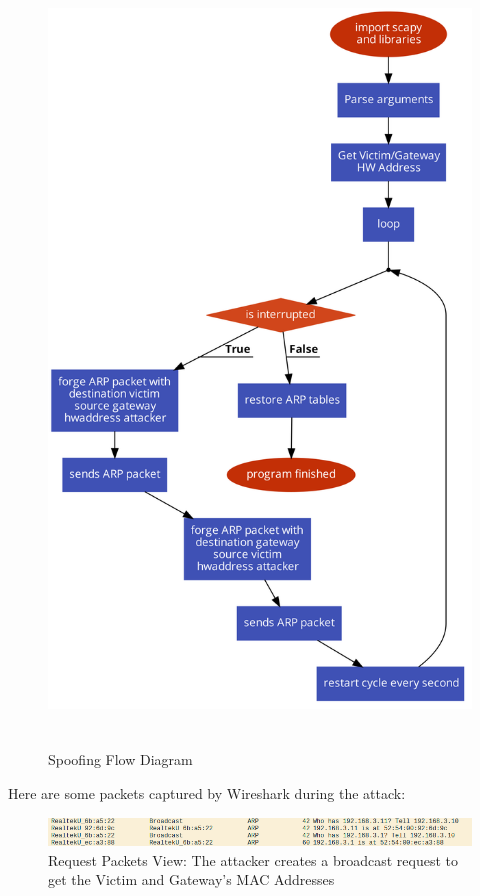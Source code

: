 \begin{figure}[h!]
 \centering
 \includegraphics[height=20.5cm]{img/arp_spoof_flow.png}
 \caption{ Spoofing Flow Diagram}
 \label{fig: Flow ARP}
\end{figure}


\newpage

Here are some packets captured by Wireshark\cite{wireshark} during the attack:

\begin{figure}[h!]
 \centering
 \includegraphics[width=13cm]{img/wireshark_request_mac.png}
 \caption{ Request Packets View: The attacker creates a broadcast  request to get the Victim and Gateway's MAC Addresses}
 \label{fig: ARP Request wireshark}
\end{figure}

